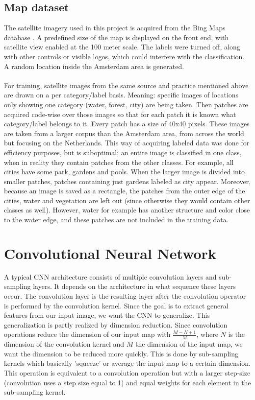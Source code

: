 \documentclass[a4paper,onecolumn]{report}
\begin{document}
\section{Map dataset}
The satellite imagery used in this project is acquired from the Bing Maps database \cite{bing}. A predefined size of the map is displayed on the front end, with satellite view enabled at the 100 meter scale. The labels were turned off, along with other controls or visible logos, which could interfere with the classification.  A random location inside the Amsterdam area is generated.
\\\\
For training, satellite images from the same source and practice mentioned above are drawn on a per category/label basis. Meaning: specific images of locations only showing one category (water, forest, city) are being taken. Then patches are acquired code-wise over those images so that for each patch it is known what category/label belongs to it. Every patch has a size of 40x40 pixels. These images are taken from a larger corpus than the Amsterdam area, from across the world but focusing on the Netherlands. This way of acquiring labeled data was done for efficiency purposes, but is suboptimal; an entire image is classified in one class, when in reality they contain patches from the other classes. For example, all cities have some park, gardens and pools. When the larger image is divided into smaller patches, patches containing just gardens labeled as city appear. Moreover, because an image is saved as a rectangle, the patches from the outer edge of the cities, water and vegetation are left out (since otherwise they would contain other classes as well). However, water for example has another structure and color close to the water edge, and these patches are not included in the training data. 

\chapter{Convolutional Neural Network}
\label{chap:CNN}
A typical CNN architecture consists of multiple convolution layers and sub-sampling layers. It depends on the architecture in what sequence these layers occur. The convolution layer is the resulting layer after the convolution operator is performed by the convolution kernel. Since the goal is to extract general features from our input image, we want the CNN to generalize. This generalization is partly realized by dimension reduction. Since convolution operations reduce the dimension of our input map with $\frac{M-N+1}{M}$, where $N$ is the dimension of the convolution kernel and $M$ the dimension of the input map, we want the dimension to be reduced more quickly. This is done by sub-sampling kernels which basically 'squeeze' or average the input map to a certain dimension. This operation is equivalent to a convolution operation but with a larger step-size (convolution uses a step size equal to 1) and equal weights for each element in the sub-sampling kernel.
\end{document}
